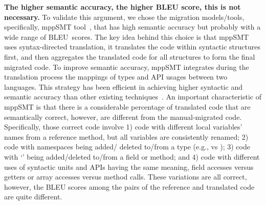 {\bf The higher semantic accuracy, the higher BLEU score, this is not necessary.} 
%
To validate this argument, we chose the migration models/tools, 
specifically, mppSMT tool~\cite{ase15}, that has high semantic 
accuracy but probably with a wide range of BLEU~scores.
The key idea behind this choice is that mppSMT uses syntax-directed
translation, \ie it translates the code within syntactic structures
first, and then aggregates the translated code for all structures to
form the final migrated code. To improve semantic accuracy, mppSMT
integrates during the translation process the mappings of types and
API usages between two languages. This strategy has been efficient in
achieving higher syntactic and semantic accuracy than other existing
techniques~\cite{ase15}. An important characteristic of mppSMT is that
there is a considerable percentage of translated code that are
semantically correct, however, are different from the manual-migrated
code. Specifically, those correct code involve 1) code with different
local variables' names from a reference method, but all variables are
consistently renamed; 2) code with namespaces being added/ deleted
to/from a type (e.g.,  vs ); 3) code
with `' being added/deleted to/from a field or method; and
4) code with different uses of syntactic units and APIs having the
same meaning, \eg field accesses versus getters or array accesses
versus method calls. These variations are all correct, however, the
BLEU scores among the pairs of the reference and translated code are
quite different.  



